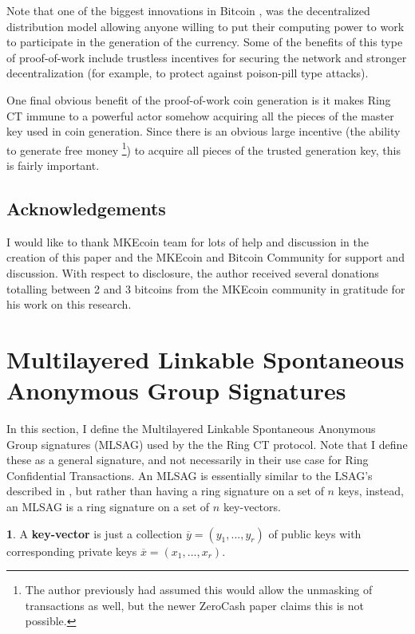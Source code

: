 \documentclass[12pt,oneside,english]{amsart}
\numberwithin{equation}{section}
\numberwithin{figure}{section}
\theoremstyle{plain}
\theoremstyle{plain}
\theoremstyle{remark}
\theoremstyle{plain}
\theoremstyle{remark}
\theoremstyle{remark}
\theoremstyle{plain}
\theoremstyle{definition}
\newtheorem{defn}[thm]{\protect\definitionname}
\providecommand{\definitionname}{Definition}
\begin{document}
Note that one of the biggest innovations in Bitcoin \cite{SN}, was
the decentralized distribution model allowing anyone willing to put
their computing power to work to participate in the generation of
the currency. Some of the benefits of this type of proof-of-work include
trustless incentives for securing the network and stronger decentralization (for example, to protect against poison-pill type attacks).  

One final obvious benefit of the proof-of-work coin generation is
it makes Ring CT immune to a powerful actor somehow acquiring all the
pieces of the master key used in coin generation. Since there is an
obvious large incentive (the ability to generate free money \footnote{The author previously had assumed this would allow the unmasking of transactions as well, but the newer ZeroCash paper claims this is not possible.}) to acquire all pieces of the trusted generation
key, this is fairly important. 


\subsection{Acknowledgements}

I would like to thank MKEcoin team for lots of help and discussion
in the creation of this paper and the MKEcoin and Bitcoin Community
for support and discussion. With respect to disclosure, the author received several donations totalling between 2 and 3 bitcoins from the MKEcoin community in gratitude for his work on this research. 



\section{Multilayered Linkable
Spontaneous Anonymous Group Signatures}
\label{MLSAGsection}



In this section, I define the Multilayered Linkable Spontaneous Anonymous 
Group signatures (MLSAG) used by the the Ring CT protocol. Note that
I define these as a general signature, and not necessarily in their
use case for Ring Confidential Transactions. An MLSAG is essentially similar to
the LSAG's described in \cite{LWW}, but rather than having a ring
signature on a set of $n$ keys, instead, an MLSAG is a ring signature
on a set of $n$ key-vectors. 
\begin{defn}
\label{def:A-key-vector-is}A \textbf{key-vector} is just a collection
$\overline{y}=\left(y_{1},...,y_{r}\right)$ of public keys with corresponding
private keys $\overline{x}=\left(x_{1},...,x_{r}\right)$. 
\end{defn}
\end{document}

